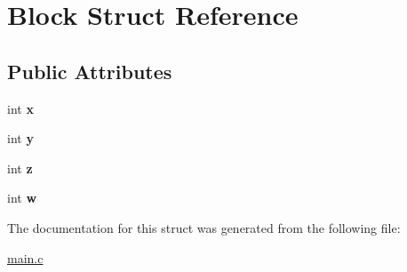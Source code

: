 \hypertarget{structBlock}{}\section{Block Struct Reference}
\label{structBlock}
\subsection*{Public Attributes}
\begin{DoxyCompactItemize}
\item 
\mbox{\label{structBlock_a13d0a6d225233353862fa5adcbadf661}} 
int {\bfseries x}
\item 
\mbox{\label{structBlock_a9328d6b6fcc9f9c019d091d87ceda41c}} 
int {\bfseries y}
\item 
\mbox{\label{structBlock_aeb6a2ee081d32a7c2e8f3ddcca235fc9}} 
int {\bfseries z}
\item 
\mbox{\label{structBlock_aea0530a4c08ea5892151575b5301940e}} 
int {\bfseries w}
\end{DoxyCompactItemize}


The documentation for this struct was generated from the following file\+:\begin{DoxyCompactItemize}
\item 
\hyperlink{main_8c}{main.\+c}\end{DoxyCompactItemize}
